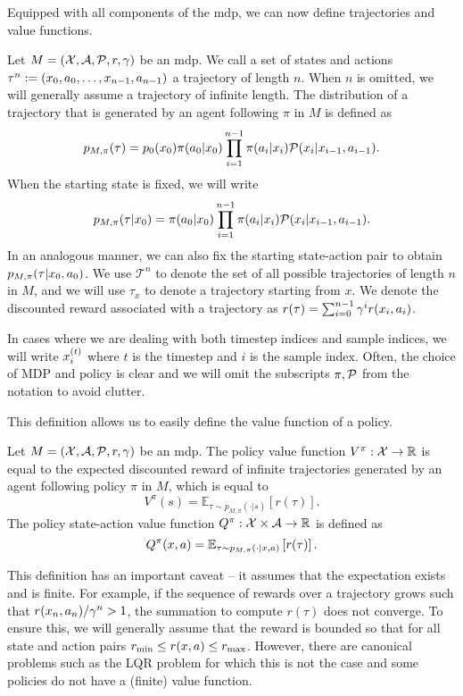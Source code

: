 Equipped with all components of the \ac{mdp}, we can now define trajectories and value functions.

\begin{definition}[Trajectories]
    Let $M = (\states,\actions,\mathcal{P},r,\gamma)$ be an \ac{mdp}.
    We call a set of states and actions $\tau^n := (\state_0,a_0,\dots,\state_{n-1},a_{n-1})$ a trajectory of length $n$.
    When $n$ is omitted, we will generally assume a trajectory of infinite length.
    The distribution of a trajectory that is generated by an agent following $\pi$ in $M$ is defined as $$p_{M, \pi}(\tau) = p_0(\state_0) \pi(a_0|\state_0) \prod_{i=1}^{n-1} \pi(a_i|\state_i) \mathcal{P}(\state_i|\state_{i-1},a_{i-1}).$$
    When the starting state is fixed, we will write $$p_{M,\pi}(\tau|\state_0) = \pi(a_0|\state_0) \prod_{i=1}^{n-1} \pi(a_i|\state_i) \mathcal{P}(\state_i|\state_{i-1},a_{i-1}).$$
    In an analogous manner, we can also fix the starting state-action pair to obtain $p_{M,\pi}(\tau|\state_0,a_0)$.
    We use $\mathcal{T}^n$ to denote the set of all possible trajectories of length $n$ in $M$, and we will use $\tau_x$ to denote a trajectory starting from $x$.
    We denote the discounted reward associated with a trajectory as $r(\tau) = \sum_{i=0}^{n-1} \gamma^i r(\state_i,a_i)$.
\end{definition}

In cases where we are dealing with both timestep indices and sample indices, we will write $\state^{(t)}_i$ where $t$ is the timestep and $i$ is the sample index.
Often, the choice of MDP and policy is clear and we will omit the subscripts $\pi,\P$ from the notation to avoid clutter.

This definition allows us to easily define the value function of a policy.

\begin{definition}
    Let $M = (\states,\actions,\mathcal{P},r,\gamma)$ be an \ac{mdp}.
    The policy value function $V^\pi: \states \rightarrow \mathbb{R}$ is equal to the expected discounted reward of infinite trajectories generated by an agent following policy $\pi$ in $M$, which is equal to $$V^\pi(s) = \mathbb{E}_{\tau \sim p_{M,\pi}(\cdot|s)} \left[ r(\tau)\right].$$
    The policy state-action value function $Q^\pi: \states \times \actions \rightarrow \mathbb{R}$ is defined as $$Q^\pi(\state,a) = \mathbb{E}_{\tau \sim p_{M,\pi}(\cdot|\state,a)} \left[ r(\tau)\right].$$
\end{definition}

This definition has an important caveat -- it assumes that the expectation exists and is finite.
For example, if the sequence of rewards over a trajectory grows such that $r(\state_n,a_n)/\gamma^n > 1$, the summation to compute $r(\tau)$ does not converge.
To ensure this, we will generally assume that the reward is bounded so that for all state and action pairs $r_{\min} \leq r(\state,a) \leq r_{\max}$.
However, there are canonical problems such as the LQR problem for which this is not the case and some policies do not have a (finite) value function.

